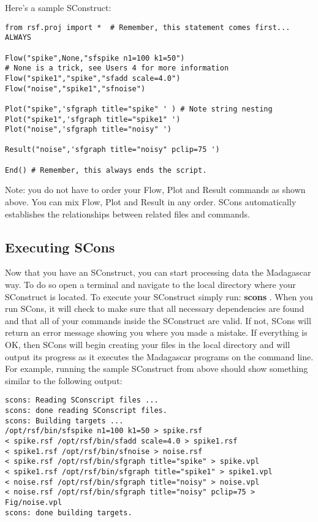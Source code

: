 Here's a sample SConstruct:
\begin{verbatim}
from rsf.proj import *  # Remember, this statement comes first... ALWAYS

Flow("spike",None,"sfspike n1=100 k1=50") 
# None is a trick, see Users 4 for more information
Flow("spike1","spike","sfadd scale=4.0")
Flow("noise","spike1","sfnoise")

Plot("spike",'sfgraph title="spike" ' ) # Note string nesting
Plot("spike1",'sfgraph title="spike1" ') 
Plot("noise",'sfgraph title="noisy" ')

Result("noise",'sfgraph title="noisy" pclip=75 ')

End() # Remember, this always ends the script.
\end{verbatim}
Note: you do not have to order your Flow, Plot and Result commands as shown above.  You can mix Flow, Plot and Result in any order.  SCons automatically establishes the relationships between related files and commands.

\subsection{Executing SCons}

Now that you have an SConstruct, you can start processing data the Madagascar way.  To do so open a terminal and navigate to the local directory where your SConstruct is located.  To execute your SConstruct simply run: \textbf{scons} .  When you run SCons, it will check to make sure that all necessary dependencies are found and that all of your commands inside the SConstruct are valid.  If not, SCons will return an error message showing you where you made a mistake.  If everything is OK, then SCons will begin creating your files in the local directory and will output its progress as it executes the Madagascar programs on the command line.  For example, running the sample SConstruct from above should show something similar to the following output:

\begin{verbatim}
scons: Reading SConscript files ...
scons: done reading SConscript files.
scons: Building targets ...
/opt/rsf/bin/sfspike n1=100 k1=50 > spike.rsf
< spike.rsf /opt/rsf/bin/sfadd scale=4.0 > spike1.rsf
< spike1.rsf /opt/rsf/bin/sfnoise > noise.rsf
< spike.rsf /opt/rsf/bin/sfgraph title="spike" > spike.vpl
< spike1.rsf /opt/rsf/bin/sfgraph title="spike1" > spike1.vpl
< noise.rsf /opt/rsf/bin/sfgraph title="noisy" > noise.vpl
< noise.rsf /opt/rsf/bin/sfgraph title="noisy" pclip=75 > Fig/noise.vpl
scons: done building targets.
\end{verbatim}

